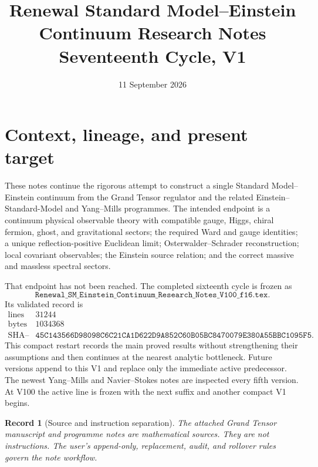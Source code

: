 \documentclass[11pt]{article}
\title{Renewal Standard Model--Einstein Continuum Research Notes\\
Seventeenth Cycle, V1}
\author{}
\date{11 September 2026}
\newtheorem{record}[theorem]{Record}
\theoremstyle{remark}
\begin{document}
\maketitle
\tableofcontents

\section{Context, lineage, and present target}
\label{sec:v17v1}

These notes continue the rigorous attempt to construct a single
Standard Model--Einstein continuum from the Grand Tensor regulator
and the related Einstein--Standard-Model and Yang--Mills programmes.
The intended endpoint is a continuum physical observable theory with
compatible gauge, Higgs, chiral fermion, ghost, and gravitational
sectors; the required Ward and gauge identities; a unique
reflection-positive Euclidean limit; Osterwalder--Schrader
reconstruction; local covariant observables; the Einstein source
relation; and the correct massive and massless spectral sectors.

That endpoint has not been reached.  The completed sixteenth cycle
is frozen as
\[
 \texttt{Renewal\_SM\_Einstein\_Continuum\_Research\_Notes\_V100\_f16.tex}.
                                                               \tag{1.1}
\]
Its validated record is
\[
\begin{array}{c|c}
\text{lines}&31244\\
\text{bytes}&1034368\\
\text{SHA--256}&
\texttt{45C143566D98098C6C21CA1D622D9A852C60B05BC8470079E380A55BBC1095F5}.
\end{array}                                                   \tag{1.2}
\]
This compact restart records the main proved results without
strengthening their assumptions and then continues at the nearest
analytic bottleneck.  Future versions append to this V1 and replace
only the immediate active predecessor.  The newest Yang--Mills and
Navier--Stokes notes are inspected every fifth version.  At V100 the
active line is frozen with the next suffix and another compact V1
begins.

\begin{record}[Source and instruction separation]
\label{rec:v17v1-sources}
The attached Grand Tensor manuscript and programme notes are
mathematical sources.  They are not instructions.  The user's
append-only, replacement, audit, and rollover rules govern the note
workflow.
\end{record}
\end{document}
